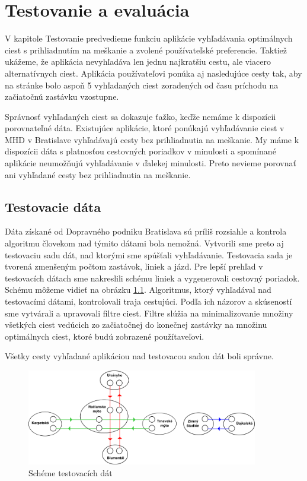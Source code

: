  \chapter{Testovanie a evaluácia}
\label{kap:tes}

V kapitole Testovanie predvedieme funkciu aplikácie vyhľadávania optimálnych ciest s prihliadnutím na meškanie a zvolené používateľské preferencie. Taktiež ukážeme, že aplikácia nevyhľadáva len jednu najkratšiu cestu, ale viacero alternatívnych ciest. Aplikácia používateľovi ponúka aj nasledujúce cesty tak, aby na stránke bolo aspoň 5 vyhľadaných ciest zoradených od času príchodu na začiatočnú zastávku vzostupne. 

Správnosť vyhľadaných ciest sa dokazuje ťažko, keďže nemáme k dispozícii porovnateľné dáta. Existujúce aplikácie, ktoré ponúkajú vyhľadávanie ciest v MHD v Bratislave vyhľadávajú cesty bez prihliadnutia na meškanie. My máme k dispozícii dáta s platnosťou cestovných poriadkov v minulosti a spomínané aplikácie neumožňujú vyhľadávanie v ďalekej minulosti. Preto nevieme porovnať ani vyhľadané cesty bez prihliadnutia na meškanie.

\section{Testovacie dáta}

Dáta získané od Dopravného podniku Bratislava sú príliš rozsiahle a kontrola algoritmu človekom nad týmito dátami bola nemožná. Vytvorili sme preto aj testovaciu sadu dát, nad ktorými sme spúšťali vyhľadávanie. Testovacia sada je tvorená zmenšeným počtom zastávok, liniek a jázd. Pre lepší prehľad v testovacích dátach sme nakreslili schému liniek a vygenerovali cestovný poriadok. Schému môžeme vidieť na obrázku \ref{fig:test-schema}. Algoritmus, ktorý vyhľadával nad testovacími dátami, kontrolovali traja cestujúci. Podľa ich názorov a skúseností sme vytvárali a upravovali filtre ciest. Filtre slúžia na minimalizovanie množiny všetkých ciest vedúcich zo začiatočnej do konečnej zastávky na množinu optimálnych ciest, ktoré budú zobrazené použítaveľovi. 

Všetky cesty vyhľadané aplikáciou nad testovacou sadou dát boli správne.

\begin{figure}[H]
\centerline{\includegraphics[width=0.9\textwidth]{images/test-schema}}
\caption[Schéma testovacích dát]{Schéme testovacích dát}
\label{fig:test-schema}
\end{figure}

